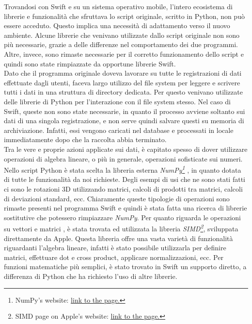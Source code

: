 Trovandosi con Swift e su un sistema operativo mobile, l'intero ecosistema di librerie
e funzionalità che sfruttava lo script originale, scritto in Python, non può essere
acceduto. Questo implica una necessità di adattamento verso il nuovo ambiente. 
Alcune librerie che venivano utilizzate dallo script originale non sono più
necessarie, grazie a delle differenze nel comportamento dei due programmi.
Altre, invece, sono rimaste necessarie per il corretto funzionamento dello script e 
quindi sono state rimpiazzate da opportune librerie Swift.\\
Dato che il programma originale doveva lavorare su tutte le registrazioni di dati 
effettuate dagli utenti, faceva largo utilizzo del file system per leggere e scrivere 
tutti i dati in una struttura di directory dedicata. Per questo venivano utilizzate
delle librerie di Python per l'interazione con il file system stesso. Nel caso di 
Swift, queste non sono state necessarie, in quanto il processo avviene soltanto 
sui dati di una singola registrazione, e non serve quindi salvare questi su memoria
di archiviazione. Infatti, essi vengono caricati nel database e processati in locale
immediatamente dopo che la raccolta abbia terminato.\\
Tra le vere e proprie azioni applicate sui dati, è capitato spesso di dover utilizzare 
operazioni di algebra lineare, o più in generale, operazioni sofisticate sui numeri.
Nello script Python è stata scelta la libreria esterna \emph{NumPy\footnote{
NumPy's website: 
\href{https://numpy.org}{\underline{link to the page.}}}} \cite{guide_numpy},
in quanto dotata
di tutte le funzionalità da noi richieste. Degli esempi di usi che ne sono stati fatti 
ci sono le rotazioni 3D utilizzando matrici, calcoli di prodotti tra matrici, calcoli 
di deviazioni standard, ecc. Chiaramente queste tipologie di operazioni sono rimaste
presenti nel programma Swift e quindi è stata fatta una ricerca di librerie sostitutive 
che potessero rimpiazzare \emph{NumPy}. Per quanto riguarda le operazioni su vettori 
e matrici \cite{simd_vector_operations}, è stata trovata ed utilizzata la libreria 
\emph{SIMD\footnote{SIMD page on Apple's website: 
\href{https://developer.apple.com/documentation/accelerate/simd}{\underline{link to the page.}}}}, sviluppata 
direttamente da Apple. Questa libreria offre una vasta varietà di funzionalità
riguardanti l'algebra lineare, infatti è stato possibile utilizzarla per definire
matrici, effettuare dot e cross product, applicare normalizzazioni, ecc.
Per funzioni matematiche più semplici, è stato trovato in Swift un supporto 
diretto, a differenza di Python che ha richiesto l'uso di altre librerie.

